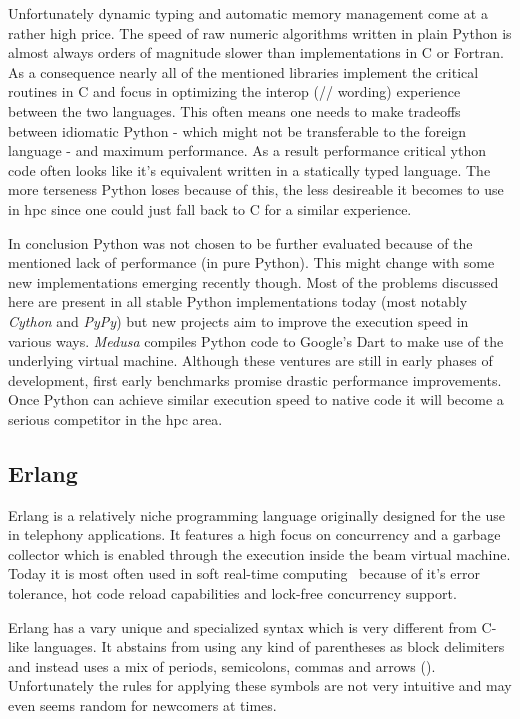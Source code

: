 Unfortunately dynamic typing and automatic memory management come at a rather high price. The speed of raw numeric algorithms written in plain Python is almost always orders of magnitude slower than implementations in C or Fortran. As a consequence nearly all of the mentioned libraries implement the critical routines in C and focus in optimizing the interop (// wording) experience between the two languages. This often means one needs to make tradeoffs between idiomatic Python - which might not be transferable to the foreign language - and maximum performance. As a result performance critical ython code often looks like it's equivalent written in a statically typed language. The more terseness Python loses because of this, the less desireable it becomes to use in \gls{hpc} since one could just fall back to C for a similar experience.

In conclusion Python was not chosen to be further evaluated because of the mentioned lack of performance (in pure Python). This might change with some new implementations emerging recently though. Most of the problems discussed here are present in all stable Python implementations today (most notably \textit{Cython} and \textit{PyPy}) but new projects aim to improve the execution speed in various ways. \textit{Medusa} compiles Python code to Google's Dart to make use of the underlying virtual machine. Although these ventures are still in early phases of development, first early benchmarks promise drastic performance improvements. Once Python can achieve similar execution speed to native code it will become a serious competitor in the \gls{hpc} area.

\subsection*{Erlang}
\label{subsec:State_of_the_art::Candidates::Erlang}

Erlang is a relatively niche programming language originally designed for the use in telephony applications. It features a high focus on concurrency and a garbage collector which is enabled through the execution inside the \gls{beam} virtual machine. Today it is most often used in soft real-time computing~ because of it's error tolerance, hot code reload capabilities and lock-free concurrency support.~\cite{intro_erlang}

Erlang has a vary unique and specialized syntax which is very different from C-like languages. It abstains from using any kind of parentheses as block delimiters and instead uses a mix of periods, semicolons, commas and arrows (\mdinline{->}). Unfortunately the rules for applying these symbols are not very intuitive and may even seems random for newcomers at times.

